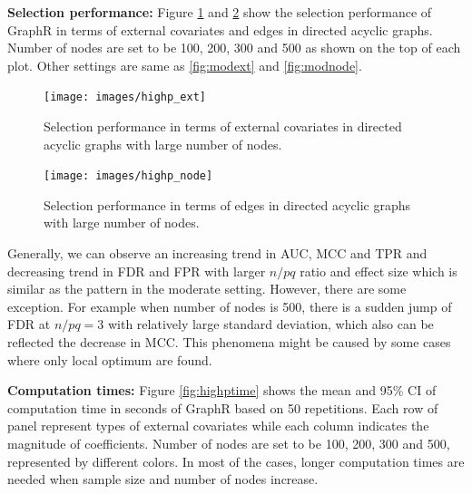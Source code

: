 \documentclass[
]{book}
\begin{document}
\textbf{Selection performance: }
Figure \ref{fig:highpext} and \ref{fig:highpnode} show the selection performance of GraphR in terms of external covariates and edges in directed acyclic graphs. Number of nodes are set to be 100, 200, 300 and 500 as shown on the top of each plot. Other settings are same as \ref{fig:modext} and \ref{fig:modnode}.

\begin{figure}

{\centering \texttt{[image: images/highp\_ext]} 

}

\caption{Selection performance in terms of external covariates in directed acyclic graphs with large number of nodes.}\label{fig:highpext}
\end{figure}

\begin{figure}

{\centering \texttt{[image: images/highp\_node]} 

}

\caption{Selection performance in terms of edges in directed acyclic graphs with large number of nodes.}\label{fig:highpnode}
\end{figure}

Generally, we can observe an increasing trend in AUC, MCC and TPR and decreasing trend in FDR and FPR with larger \(n/pq\) ratio and effect size which is similar as the pattern in the moderate setting. However, there are some exception. For example when number of nodes is 500, there is a sudden jump of FDR at \(n/pq=3\) with relatively large standard deviation, which also can be reflected the decrease in MCC. This phenomena might be caused by some cases where only local optimum are found.

\textbf{Computation times: }
Figure \ref{fig:highptime} shows the mean and 95\% CI of computation time in seconds of GraphR based on 50 repetitions. Each row of panel represent types of external covariates while each column indicates the magnitude of coefficients. Number of nodes are set to be 100, 200, 300 and 500, represented by different colors. In most of the cases, longer computation times are needed when sample size and number of nodes increase.
\end{document}
